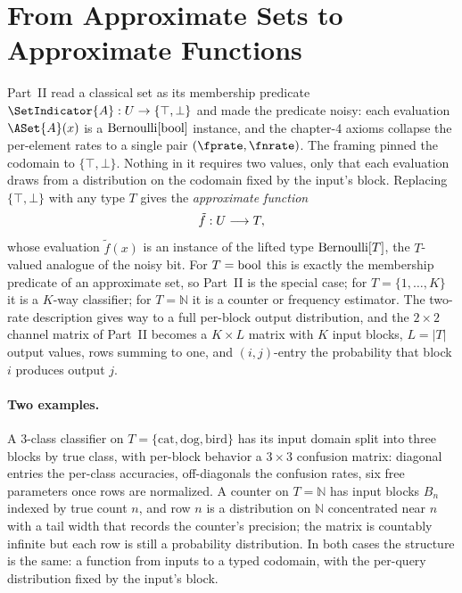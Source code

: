 %

\section{From Approximate Sets to Approximate Functions}
\label{sec:atom-to-function}

Part~II read a classical set as its membership predicate
$\SetIndicator{A} : \Universe \to \{\top, \bot\}$ and made the predicate
noisy: each evaluation $\ASet{A}(x)$ is a $\mathrm{Bernoulli}[\mathrm{bool}]$ instance, and
the chapter-4 axioms collapse the per-element rates to a single pair
$(\fprate, \fnrate)$. The framing pinned the codomain to $\{\top, \bot\}$.
Nothing in it requires two values, only that each evaluation draws from a
distribution on the codomain fixed by the input's block. Replacing
$\{\top, \bot\}$ with any type $T$ gives the \emph{approximate
function}
\[
  \tilde{f} : U \longrightarrow T,
\]
whose evaluation $\tilde{f}(x)$ is an instance of the lifted type
$\mathrm{Bernoulli}[T]$, the $T$-valued analogue of the noisy bit. For $T =
\mathrm{bool}$ this is exactly the membership predicate of an approximate set, so
Part~II is the special case; for $T = \{1, \ldots, K\}$ it is a $K$-way
classifier; for $T = \mathbb{N}$ it is a counter or frequency estimator. The
two-rate description gives way to a full per-block output distribution, and the
$2 \times 2$ channel matrix of Part~II becomes a $K \times L$ matrix with $K$
input blocks, $L = |T|$ output values, rows summing to one, and $(i,j)$-entry
the probability that block $i$ produces output $j$.

\paragraph{Two examples.}
A 3-class classifier on $T = \{\text{cat}, \text{dog}, \text{bird}\}$ has its
input domain split into three blocks by true class, with per-block behavior a
$3 \times 3$ confusion matrix: diagonal entries the per-class accuracies,
off-diagonals the confusion rates, six free parameters once rows are
normalized. A counter on $T = \mathbb{N}$ has input blocks $B_n$ indexed by
true count $n$, and row $n$ is a distribution on $\mathbb{N}$ concentrated near
$n$ with a tail width that records the counter's precision; the matrix is
countably infinite but each row is still a probability distribution. In both
cases the structure is the same: a function from inputs to a typed codomain,
with the per-query distribution fixed by the input's block.

